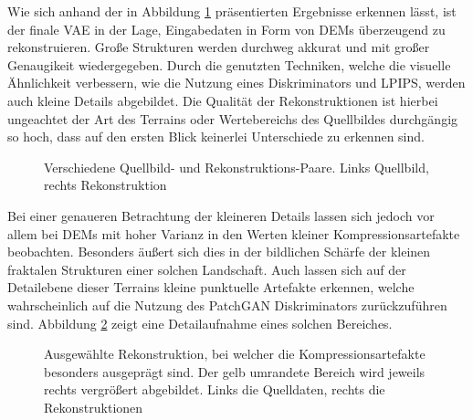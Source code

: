 Wie sich anhand der in Abbildung \ref{fig:vae_recons} präsentierten Ergebnisse erkennen lässt, ist der finale \ac{VAE} in der Lage, Eingabedaten in Form von \ac{DEM}s überzeugend zu rekonstruieren. Große Strukturen werden durchweg akkurat und mit großer Genaugikeit wiedergegeben. Durch die genutzten Techniken, welche die visuelle Ähnlichkeit verbessern, wie die Nutzung eines Diskriminators und \ac{LPIPS}, werden auch kleine Details abgebildet. Die Qualität der Rekonstruktionen ist hierbei ungeachtet der Art des Terrains oder Wertebereichs des Quellbildes durchgängig so hoch, dass auf den ersten Blick keinerlei Unterschiede zu erkennen sind. \\
\begin{figure}[H]
    \centering

    \vspace{-8pt}

    
    \caption{Verschiedene Quellbild- und Rekonstruktions-Paare. Links Quellbild, rechts Rekonstruktion}
    \label{fig:vae_recons}
\end{figure}
Bei einer genaueren Betrachtung der kleineren Details lassen sich jedoch vor allem bei \ac{DEM}s mit hoher Varianz in den Werten kleiner Kompressionsartefakte beobachten. Besonders äußert sich dies in der bildlichen Schärfe der kleinen fraktalen Strukturen einer solchen Landschaft. Auch lassen sich auf der Detailebene dieser Terrains kleine punktuelle Artefakte erkennen, welche wahrscheinlich auf die Nutzung des PatchGAN Diskriminators zurückzuführen sind. Abbildung \ref{fig:vae_artefacts} zeigt eine Detailaufnahme eines solchen Bereiches.
\begin{figure}[htbp]
    \centering
    \caption{Ausgewählte Rekonstruktion, bei welcher die Kompressionsartefakte besonders ausgeprägt sind. Der gelb umrandete Bereich wird jeweils rechts vergrößert abgebildet. Links die Quelldaten, rechts  die Rekonstruktionen}
    \label{fig:vae_artefacts}
\end{figure} \\
